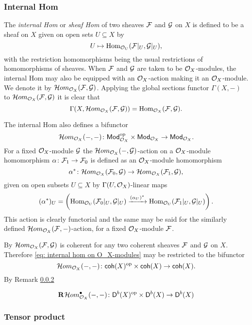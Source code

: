 \subsubsection{Internal Hom}
\label{Subsubsection: Internal Hom}

The \emph{internal Hom} or \emph{sheaf Hom} of two sheaves $\mathcal F$ and $\mathcal G$ on $X$ is defined to be a sheaf on $X$ given on open sets $U \subseteq X$ by
\[
    U \mapsto \operatorname{Hom}_{{\mathcal{O}_{U}}}(\mathcal F|_U, \mathcal G|_U),
\]
with the restriction homomorphisms being the usual restrictions of homomorphisms of sheaves. When $\mathcal F$ and $\mathcal G$ are taken to be ${\mathcal{O}_{X}}$-modules, the internal Hom may also be equipped with an ${\mathcal{O}_{X}}$-action making it an ${\mathcal{O}_{X}}$-module. We denote it by $\localhom_{\struct{X}}(\F, \G)$. Applying the global sections functor $\Gamma(X, -)$ to $\localhom_{\struct{X}}(\F, \G)$ it is clear that
\[
    \Gamma(X, \localhom_{\struct{X}}(\F, \G)) = \Hom_{\struct{X}}(\F, \G).
\]

The internal Hom also defines a bifunctor
\begin{equation}
    \label{eq: internal hom on O_X-modules}
    \localhom_{\struct{X}}(-, -) \colon \mod{\struct{X}}^\op \times \mod{\struct{X}} \to \mod{\struct{X}}.
\end{equation}
For a fixed ${\mathcal{O}_{X}}$-module $\mathcal G$ the $\localhom_{\struct{X}}(-, \G)$-action on a ${\mathcal{O}_{X}}$-module homomorphism $\alpha \colon \mathcal F_1 \to \mathcal F_0$ is defined as an ${\mathcal{O}_{X}}$-module homomorphism
\[
    \alpha^* \colon \localhom_{\struct{X}}(\F_0, \G) \to \localhom_{\struct{X}}(\F_1, \G),
\]
given on open subsets $U \subseteq X$ by $\Gamma(U, {\mathcal{O}_{X}})$-linear maps
\[
    (\alpha^*)_U = \left(\operatorname{Hom}_{{\mathcal{O}_{U}}}(\mathcal F_0|_U, \mathcal G|_U) \xrightarrow{(\alpha_U)^*} \operatorname{Hom}_{{\mathcal{O}_{U}}}(\mathcal F_1|_U, \mathcal G|_U)\right).
\]
This action is clearly functorial and the same may be said for the similarly defined $\localhom_{\struct{X}}(\F, -)$-action, for a fixed ${\mathcal{O}_{X}}$-module $\mathcal F$.

By \cite[EGA II, \S 9, Proposition 9.1.1]{EGA} $\localhom_{\struct{X}}(\F, \G)$ is coherent for any two coherent sheaves $\mathcal F$ and $\mathcal G$ on $X$. Therefore \eqref{eq: internal hom on O_X-modules} may be restricted to the bifunctor
\[
    \localhom[X](-, -) \colon \coherent{X}^\op \times \coherent{X} \to \coherent{X}.
\]
By Remark \ref{} 


\[
    \rderived{}{\localhom[X]^\bullet(-, -)} \colon \derb{X}^\op \times \derb{X} \to \derb{X}
\]

\subsubsection{Tensor product}

